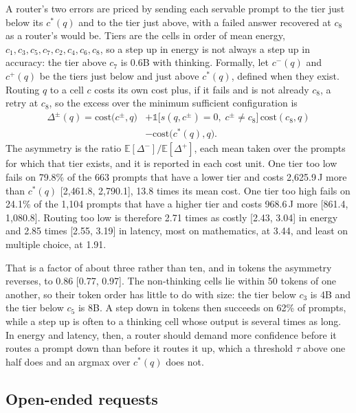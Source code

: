 \documentclass[final,5p,times,twocolumn]{elsarticle}
\theoremstyle{plain}
\newcommand{\cstar}{c^{*}}
\newcommand{\cost}{\mathrm{cost}}
\begin{document}
A router's two errors are priced by sending each servable prompt to the tier
just below its $\cstar(q)$ and to the tier just above, with a failed answer
recovered at $c_8$ as a router's would be. Tiers are the cells in order of
mean energy, $c_1, c_3, c_5, c_7, c_2, c_4, c_6, c_8$, so a step up in energy
is not always a step up in accuracy: the tier above $c_7$ is 0.6B with
thinking. Formally, let $c^{-}(q)$ and $c^{+}(q)$ be the tiers just below and
just above $\cstar(q)$, defined when they exist. Routing $q$ to a cell $c$
costs its own cost plus, if it fails and is not already $c_8$, a retry at
$c_8$, so the excess over the minimum sufficient configuration is
\begin{equation}
  \begin{split}
    \Delta^{\pm}(q) = \cost\bigl(c^{\pm}, q\bigr)
    &+ \mathbb{1}\bigl[s(q, c^{\pm}) = 0,\; c^{\pm} \neq c_8\bigr]\,
      \cost(c_8, q)\\
    &- \cost\bigl(\cstar(q), q\bigr).
  \end{split}
  \label{eq:asym}
\end{equation}
The asymmetry is the ratio $\mathbb{E}[\Delta^{-}] / \mathbb{E}[\Delta^{+}]$,
each mean taken over the prompts for which that tier exists, and it is
reported in each cost unit. One tier too low fails on 79.8\% of the 663 prompts that have a
lower tier and costs 2{,}625.9\,J more than $\cstar(q)$ [2{,}461.8,
2{,}790.1], 13.8 times its mean cost. One tier too high fails on 24.1\% of
the 1{,}104 prompts that have a higher tier and costs 968.6\,J more [861.4,
1{,}080.8]. Routing too low is therefore 2.71 times as costly [2.43, 3.04] in
energy and 2.85 times [2.55, 3.19] in latency, most on mathematics, at 3.44,
and least on multiple choice, at 1.91.

That is a factor of about three rather than ten, and in tokens the asymmetry
reverses, to 0.86 [0.77, 0.97]. The non-thinking cells lie within 50 tokens
of one another, so their token order has little to do with size: the tier
below $c_3$ is 4B and the tier below $c_5$ is 8B. A step down in tokens then
succeeds on 62\% of prompts, while a step up is often to a thinking cell
whose output is several times as long. In energy and latency, then, a router
should demand more confidence before it routes a prompt down than before it
routes it up, which a threshold $\tau$ above one half does and an argmax over
$\cstar(q)$ does not.

\subsection{Open-ended requests}
\label{sec:results-open}
\end{document}
